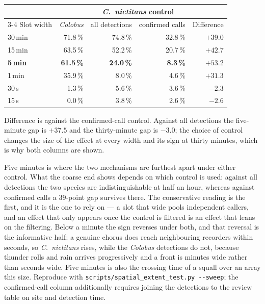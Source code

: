 \documentclass[review,3p,times]{elsarticle}
\begin{document}
\begin{center}
\begin{tabular}{lrrrr}
\toprule
 & & \multicolumn{2}{c}{\textit{C.\ nictitans} control} & \\
\cmidrule(lr){3-4}
Slot width & \textit{Colobus} & all detections & confirmed calls & Difference \\
\midrule
30\,min & 71.8\,\% & 74.8\,\% & 32.8\,\% & $+39.0$ \\
15\,min & 63.5\,\% & 52.2\,\% & 20.7\,\% & $+42.7$ \\
\textbf{5\,min} & \textbf{61.5\,\%} & \textbf{24.0\,\%} & \textbf{8.3\,\%} & $\mathbf{+53.2}$ \\
1\,min & 35.9\,\% & 8.0\,\% & 4.6\,\% & $+31.3$ \\
30\,s & 1.3\,\% & 5.6\,\% & 3.6\,\% & $-2.3$ \\
15\,s & 0.0\,\% & 3.8\,\% & 2.6\,\% & $-2.6$ \\
\bottomrule
\end{tabular}
\end{center}

\noindent Difference is against the confirmed-call control. Against all
detections the five-minute gap is $+37.5$ and the thirty-minute gap is $-3.0$;
the choice of control changes the size of the effect at every width and its sign
at thirty minutes, which is why both columns are shown.

Five minutes is where the two mechanisms are furthest apart under either
control. What the coarse end shows depends on which control is used: against all
detections the two species are indistinguishable at half an hour, whereas
against confirmed calls a 39-point gap survives there. The conservative reading
is the first, and it is the one to rely on --- a slot that wide pools
independent callers, and an effect that only appears once the control is
filtered is an effect that leans on the filtering. Below a minute the sign
reverses under both, and that reversal is the
informative half: a genuine chorus does reach neighbouring recorders within
seconds, so \textit{C.\ nictitans} rises, while the \textit{Colobus} detections
do not, because thunder rolls and rain arrives progressively and a front is
minutes wide rather than seconds wide. Five minutes is also the crossing time of
a squall over an array this size. Reproduce with
\texttt{scripts/spatial\_extent\_test.py -{}-sweep}; the confirmed-call column
additionally requires joining the detections to the review table on site and
detection time.
\end{document}
